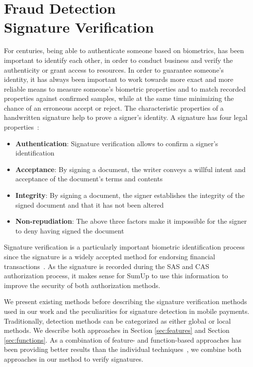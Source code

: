 \documentclass[a4paper, oneside]{csthesis}
\begin{document}

\chapter{Fraud Detection \\Signature Verification}
\label{chp:signature-verification}

For centuries, being able to authenticate someone based on biometrics, has been important to identify each other, in order to conduct business and verify the authenticity or grant access to resources. In order to guarantee someone's identity, it has always been important to work towards more exact and more reliable means to measure someone's biometric properties and to match recorded properties against confirmed samples, while at the same time minimizing the chance of an erroneous accept or reject. The characteristic properties of a handwritten signature help to prove a signer's identity. A signature has four legal properties~\cite{Hanmandlu05}:

\begin{itemize}
\item \textbf{Authentication}: Signature verification allows to confirm a signer's identification
\item \textbf{Acceptance}: By signing a document, the writer conveys a willful intent and acceptance of the document's terms and contents
\item \textbf{Integrity}: By signing a document, the signer establishes the integrity of the signed document and that it has not been altered
\item \textbf{Non-repudiation}: The above three factors make it impossible for the signer to deny having signed the document
\end{itemize}

Signature verification is a particularly important biometric identification process since the signature is a widely accepted method for endorsing financial transactions~\cite{1227706}.
As the signature is recorded during the SAS and CAS authorization process, it makes sense for SumUp to use this information to improve the security of both authorization methods.

We present existing methods before describing the signature verification methods used in our work and the peculiarities for signature detection in mobile payments.
Traditionally, detection methods can be categorized as either global or local methods. We describe both approaches in Section \ref{sec:features} and Section \ref{sec:functions}. As a combination of feature- and function-based approaches has been providing better results than the individual techniques~\cite{fierrez2005line}, we combine both approaches in our method to verify signatures.
\end{document}
